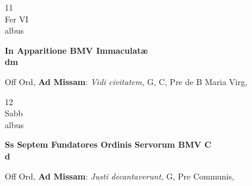 \documentclass[10pt, openany]{book}
\begin{document}
        \begin{center}
            \begin{minipage}{3.5in}
                \vspace{2em}
                \begin{minipage}{0.5in}
                    {\Huge 11} \\
                    {\normalsize Fer VI} \\
                    {\normalsize albus}
                \end{minipage}
                \begin{minipage}{3.0in}
                    \textbf{ \large In Apparitione BMV Immaculatæ \\
                    \textnormal{\normalsize dm}} \\ 
                \end{minipage}
                \begin{justify}Off Ord, \textbf{Ad Missam}: \textit{Vidi civitatem,} G, C, Pre de B Maria Virg,  
                \end{justify}
            \end{minipage}
        \end{center}
    
        \begin{center}
            \begin{minipage}{3.5in}
                \vspace{2em}
                \begin{minipage}{0.5in}
                    {\Huge 12} \\
                    {\normalsize Sabb} \\
                    {\normalsize albus}
                \end{minipage}
                \begin{minipage}{3.0in}
                    \textbf{ \large Ss Septem Fundatores Ordinis Servorum BMV C \\
                    \textnormal{\normalsize d}} \\ 
                \end{minipage}
                \begin{justify}Off Ord, \textbf{Ad Missam}: \textit{Justi decantaverunt,} G, Pre Communis,  
                \end{justify}
            \end{minipage}
        \end{center}
    
\end{document}
